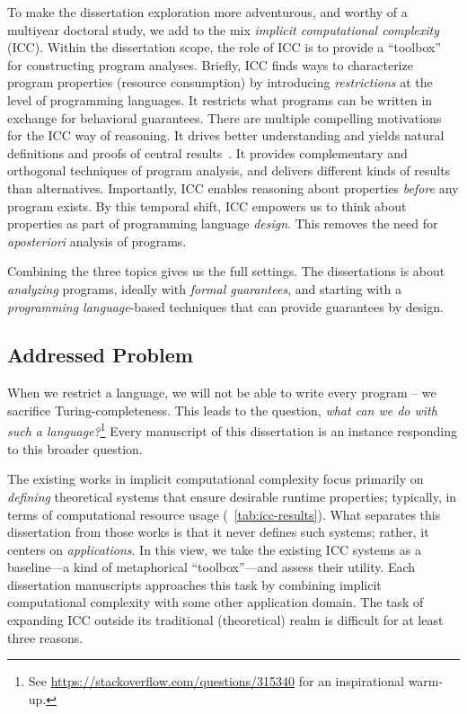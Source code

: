 To make the dissertation exploration more adventurous, and worthy of a multiyear doctoral study, we add
to the mix \emph{implicit computational complexity} (ICC).
Within the dissertation scope, the role of ICC is to provide a \enquote{toolbox} for constructing program analyses.
Briefly, ICC finds ways to characterize program properties (resource consumption) by introducing \emph{restrictions} at the level of programming languages.
It restricts what programs can be written in exchange for behavioral guarantees.
There are multiple compelling motivations for the ICC way of reasoning.
It drives better understanding and yields natural definitions and proofs of central results~\cite{kristiansen2017}.
It provides complementary and orthogonal techniques of program analysis, and delivers different kinds of results than alternatives.
Importantly, ICC enables reasoning about properties \emph{before} any program exists.
By this temporal shift, ICC empowers us to think about properties as part of programming language \emph{design}.
This removes the need for \emph{aposteriori} analysis of programs.

Combining the three topics gives us the full settings.
The dissertations is about \emph{analyzing} programs, ideally with \emph{formal guarantees}, and starting with a \emph{programming language}-based techniques that can provide guarantees by design.

\subsection{Addressed Problem}
\label{subsec:problem}



When we restrict a language, we will not be able to write every program -- \ie we sacrifice Turing-completeness.
This leads to the question, \emph{what can we do with such a language?}\footnote{
See \url{https://stackoverflow.com/questions/315340} for an inspirational warm-up.}
Every manuscript of this dissertation is an instance responding to this broader question.

The existing works in implicit computational complexity focus primarily on \emph{defining} theoretical systems that ensure desirable runtime properties;
typically, in terms of computational resource usage (\cf~\autoref{tab:icc-results}).
What separates this dissertation from those works is that it never defines such systems;
rather, it centers on \emph{applications}.
In this view, we take the existing ICC systems as a baseline---a kind of metaphorical \enquote{toolbox}---and assess their utility.
Each dissertation manuscripts approaches this task by combining implicit computational complexity with some other application domain.
The task of expanding ICC outside its traditional (theoretical) realm is difficult for at least three reasons.

